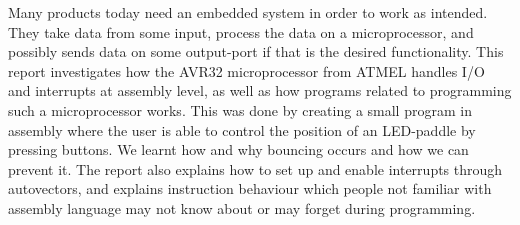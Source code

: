 Many products today need an embedded system in order to work as
intended. They take data from some input, process the data on a
microprocessor, and possibly sends data on some output-port if that is
the desired functionality. This report investigates how the AVR32
microprocessor from ATMEL handles I/O and interrupts at assembly level,
as well as how programs related to programming such a microprocessor
works. This was done by creating a small program in assembly where the
user is able to control the position of an LED-paddle by pressing
buttons.  We learnt how and why bouncing occurs and how we can prevent
it. The report also explains how to set up and enable interrupts through
autovectors, and explains instruction behaviour which people not
familiar with assembly language may not know about or may forget during
programming.

\begin{comment}
TODO:
- rask konklusjon 
\end{comment}

